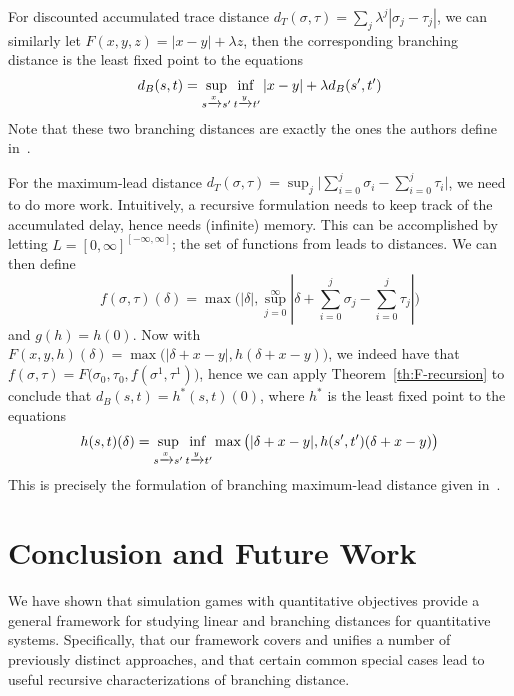 \documentclass[copyright,creativecommons,sharealike]{eptcs}
\theoremstyle{plain}
\newcommand*\tto[1]{\xrightarrow{#1}}
\begin{document}
For discounted accumulated trace distance $d_T( \sigma, \tau)= \sum_j
\lambda^j| \sigma_j- \tau_j|$, we can similarly let $F( x, y, z)=|
x- y|+ \lambda z$, then the corresponding branching distance is the
least fixed point to the equations
\begin{equation*}
  d_B( s, t)= \adjustlimits \sup_{ s\tto x s'} \inf_{ t\tto y
    t'} | x- y|+ \lambda d_B( s', t')
\end{equation*}
Note that these two branching distances are exactly the ones the
authors define in~\cite{journals/jlap/ThraneFL10}.

For the maximum-lead distance $d_T( \sigma, \tau)= \sup_j \bigl|
\sum_{i= 0}^j \sigma_i - \sum_{i= 0}^j \tau_i\bigr|$, we need to do
more work.  Intuitively, a recursive formulation needs to keep track
of the accumulated delay, hence needs (infinite) memory.  This can be
accomplished by letting $L=[ 0, \infty]^{[ -\infty, \infty]}$; the set
of functions from leads to distances.  We can then define
\begin{equation*}
  f( \sigma,
  \tau)( \delta)= \max\big(| \delta|, \sup_{ j= 0}^\infty| \delta+ \sum_{ i=
    0}^j \sigma_j- \sum_{ i= 0}^j \tau_j|\big)
\end{equation*}
and $g( h)= h( 0)$. Now with $F( x, y, h)( \delta)= \max\big(| \delta+
x- y|, h( \delta+ x- y)\big)$, we indeed have that $f( \sigma, \tau)=
F\big( \sigma_0, \tau_0, f( \sigma^1, \tau^1)\big)$, hence we can
apply Theorem~\ref{th:F-recursion} to conclude that $d_B( s, t)= h^*(
s, t)( 0)$, where $h^*$ is the least fixed point to the equations
\begin{equation*}
  h( s, t)( \delta)= \adjustlimits \sup_{ s\tto x s'} \inf_{ t\tto y
    t'} \max\big(| \delta+ x- y|, h( s', t')( \delta+ x- y)\big)
\end{equation*}
This is precisely the formulation of branching maximum-lead distance
given in~\cite{conf/formats/2005/HenzM05}.

\section{Conclusion and Future Work}

We have shown that simulation games with quantitative objectives
provide a general framework for studying linear and branching
distances for quantitative systems.  Specifically, that our framework covers and unifies a number of
previously distinct approaches, and that certain common special cases
lead to useful recursive characterizations of branching distance.
\end{document}
